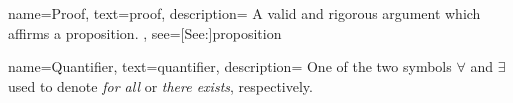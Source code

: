{
    name={Proof},
    text={proof},
    description={
        A valid and rigorous argument which affirms a proposition.
    },
    see=[See:]{proposition}
}


{
    name={Quantifier},
    text={quantifier},
    description={
        One of the two symbols $\forall$ and $\exists$ used to denote
        \textit{for all} or \textit{there exists}, respectively.
    }
}
